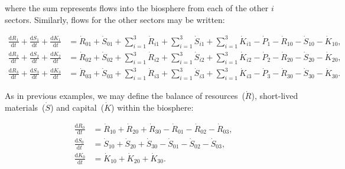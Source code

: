 \noindent{}where the sum represents flows
into the biosphere from each of the other $i$ sectors.
Similarly, flows for the other sectors may be written:

\begin{align} \label{eq:C_CV_1}
	\frac{\mathrm{d}R_{1}}{\mathrm{d}t} 
	+ \frac{\mathrm{d}S_{1}}{\mathrm{d}t}	
	+ \frac{\mathrm{d}K_{1}}{\mathrm{d}t}		
	& =  \dot{R}_{01} 
	+ \dot{S}_{01}
	+ \sum_{i = 1}^{3}\dot{R}_{i1}
	+ \sum_{i = 1}^{3}\dot{S}_{i1}
	+ \sum_{i = 1}^{3}\dot{K}_{i1}
	- \dot{P}_{1}
	- \dot{R}_{10} 
	- \dot{S}_{10}
	- \dot{K}_{10},										\\
	\label{eq:C_CV_2}
	\frac{\mathrm{d}R_{2}}{\mathrm{d}t} 
	+ \frac{\mathrm{d}S_{2}}{\mathrm{d}t}	
	+ \frac{\mathrm{d}K_{2}}{\mathrm{d}t}		
	& =  \dot{R}_{02} 
	+ \dot{S}_{02}
	+ \sum_{i = 1}^{3}\dot{R}_{i2}
	+ \sum_{i = 1}^{3}\dot{S}_{i2}
	+ \sum_{i = 1}^{3}\dot{K}_{i2}
	- \dot{P}_{2}
	- \dot{R}_{20} 
	- \dot{S}_{20}
	- \dot{K}_{20},										\\	
	\label{eq:C_CV_3}
	\frac{\mathrm{d}R_{3}}{\mathrm{d}t} 
	+ \frac{\mathrm{d}S_{3}}{\mathrm{d}t}	
	+ \frac{\mathrm{d}K_{3}}{\mathrm{d}t}		
	& =  \dot{R}_{03} 
	+ \dot{S}_{03}
	+ \sum_{i = 1}^{3}\dot{R}_{i3}
	+ \sum_{i = 1}^{3}\dot{S}_{i3}
	+ \sum_{i = 1}^{3}\dot{K}_{i3}
	- \dot{P}_{3}
	- \dot{R}_{30} 
	- \dot{S}_{30}
	- \dot{K}_{30}.										
\end{align}

%

As in previous examples,
we may define the balance of 
resources~($\dot{R}$),
short-lived materials~($\dot{S}$) and
capital~($\dot{K}$) within the biosphere:

\begin{align}\label{eq:C_dR0}
	\frac{\mathrm{d}R_{0}}{\mathrm{d}t}	&
	= \dot{R}_{10}
	+ \dot{R}_{20}
	+ \dot{R}_{30}
	- \dot{R}_{01}
	- \dot{R}_{02}
	- \dot{R}_{03},										\\
\label{eq:C_dS0}
	\frac{\mathrm{d}S_{0}}{\mathrm{d}t}	&
	= \dot{S}_{10}
	+ \dot{S}_{20}
	+ \dot{S}_{30}	
	- \dot{S}_{01}
	- \dot{S}_{02}
	- \dot{S}_{03},										\\	
\label{eq:C_dK0}
	\frac{\mathrm{d}K_{0}}{\mathrm{d}t}	&
	= \dot{K}_{10}
	+ \dot{K}_{20}
	+ \dot{K}_{30}.
\end{align}

